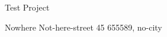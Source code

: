 \documentclass[12pt,a4paper]{article} %
\begin{document}
Test Project

Nowhere
Not-here-street 45
655589, no-city
\end{document}
